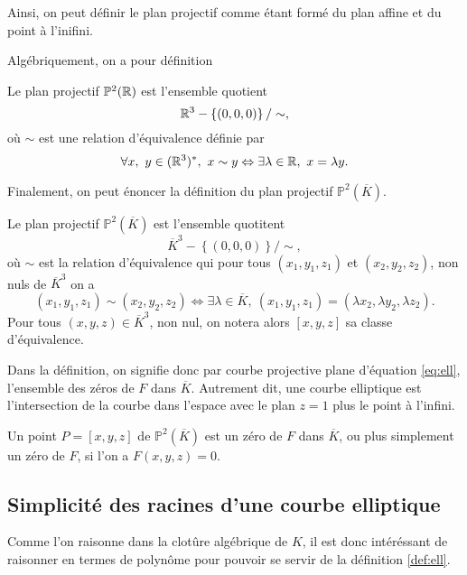 Ainsi, on peut définir le plan projectif comme étant formé du plan affine et du point à
l'inifini.

Algébriquement, on a pour définition

\begin{definition}
    Le plan projectif $\mathbb{P}^2(\mathbb{R})$ est l'ensemble quotient
    \[
    \mathbb{R}^3 - \left\{ (0,0,0) \right\} / \sim
    ,\] 
    où $\sim$ est une relation d'équivalence définie par
    \[
    \forall x,\ y \in (\mathbb{R}^3)^{*},\ x \sim y \Leftrightarrow \exists \lambda \in \mathbb{R},\ x=\lambda y
    .\] 
\end{definition}

Finalement, on peut énoncer la définition du plan projectif $\mathbb{P}^2(\overline{K})$.

\begin{definition}
    Le plan projectif $\mathbb{P}^2(\overline{K})$ est l'ensemble quotitent
    \[
    \overline{K}^3 - \left\{ (0,0,0) \right\} / \sim
    ,\] 
    où $\sim$ est la relation d'équivalence qui pour tous $(x_1,y_1,z_1)$ et
    $(x_2,y_2,z_2)$, non nuls de $\overline{K}^3$ on a
    \[
        (x_1,y_1,z_1) \sim (x_2,y_2,z_2) \iff \exists \lambda \in \overline{K},\
        (x_1,y_1,z_1)=(\lambda x_2, \lambda y_2, \lambda z_2)
    .\] 
    Pour tous $(x,y,z) \in \overline{K}^3$, non nul, on notera alors $\left[ x,y,z \right] $ sa
    classe d'équivalence.
\end{definition}

\begin{remarque}
    Dans la définition, on signifie donc par courbe projective plane d'équation \eqref{eq:ell},
l'ensemble des zéros de $F$ dans $\overline{K}$. Autrement dit, une courbe elliptique est
l'intersection de la courbe dans l'espace avec le plan $z=1$ plus le point à l'infini. 

    Un point $P=\left[ x,y,z \right] $ de $\mathbb{P}^2(\overline{K})$ est un zéro de $F$ dans $\overline{K}$, ou plus simplement un zéro de $F$, si l'on a $F(x,y,z)=0$.
\end{remarque}

\subsection{Simplicité des racines d'une courbe elliptique}

Comme l'on raisonne dans la clotûre algébrique de $K$, il est donc intéréssant de raisonner en
termes de polynôme pour pouvoir se servir de la définition \ref{def:ell}.

